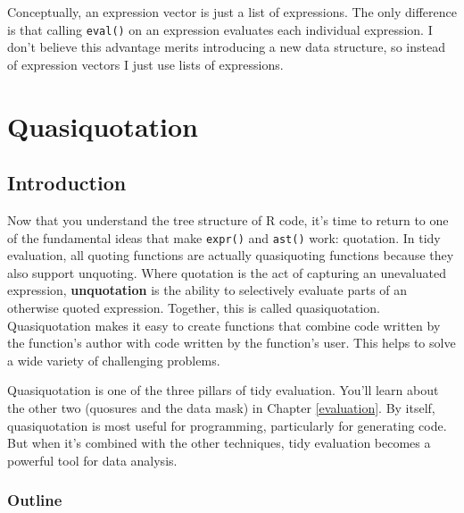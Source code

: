 \documentclass[]{book}
\begin{document}
Conceptually, an expression vector is just a list of expressions. The only difference is that calling \texttt{eval()} on an expression evaluates each individual expression. I don't believe this advantage merits introducing a new data structure, so instead of expression vectors I just use lists of expressions.

\hypertarget{quasiquotation}{%
\chapter{Quasiquotation}\label{quasiquotation}}

\hypertarget{introduction-2}{%
\section{Introduction}\label{introduction-2}}

Now that you understand the tree structure of R code, it's time to return to one of the fundamental ideas that make \texttt{expr()} and \texttt{ast()} work: quotation. In tidy evaluation, all quoting functions are actually quasiquoting functions because they also support unquoting. Where quotation is the act of capturing an unevaluated expression, \textbf{unquotation} is the ability to selectively evaluate parts of an otherwise quoted expression. Together, this is called quasiquotation. Quasiquotation makes it easy to create functions that combine code written by the function's author with code written by the function's user. This helps to solve a wide variety of challenging problems.

Quasiquotation is one of the three pillars of tidy evaluation. You'll learn about the other two (quosures and the data mask) in Chapter \ref{evaluation}. By itself, quasiquotation is most useful for programming, particularly for generating code. But when it's combined with the other techniques, tidy evaluation becomes a powerful tool for data analysis.

\hypertarget{outline-2}{%
\subsection*{Outline}\label{outline-2}}
\end{document}
